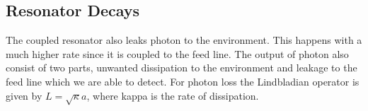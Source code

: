



\subsection{Resonator Decays}\label{sec:resonator_decays}
The coupled resonator also leaks photon to the environment. This happens with a much higher rate since it is coupled to the feed line. The output of photon also consist of two parts, unwanted dissipation to the environment and leakage to the feed line which we are able to detect. For photon loss the Lindbladian operator is given by $L = \sqrt{\kappa}a$, where kappa is the rate of dissipation.

